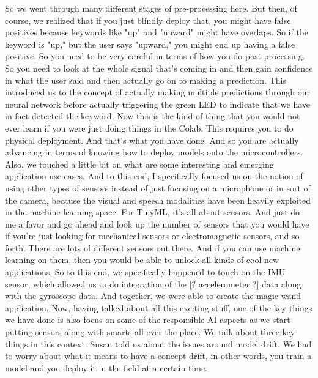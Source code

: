     So we went through many different stages of pre-processing here.
    But then, of course, we realized that if you just blindly deploy that,
    you might have false positives because keywords like "up" and "upward"
    might have overlaps.
    So if the keyword is "up," but the user says "upward,"
    you might end up having a false positive.
    So you need to be very careful in terms of how you do post-processing.
    So you need to look at the whole signal that's coming in
    and then gain confidence in what the user said
    and then actually go on to making a prediction.
    This introduced us to the concept of actually making multiple predictions
    through our neural network before actually
    triggering the green LED to indicate that we
    have in fact detected the keyword.
    Now this is the kind of thing that you would not ever
    learn if you were just doing things in the Colab.
    This requires you to do physical deployment.
    And that's what you have done.
    And so you are actually advancing in terms
    of knowing how to deploy models onto the microcontrollers.
    Also, we touched a little bit on what are some interesting and emerging
    application use cases.
    And to this end, I specifically focused us
    on the notion of using other types of sensors
    instead of just focusing on a microphone or in sort of the camera,
    because the visual and speech modalities have been heavily exploited
    in the machine learning space.
    For TinyML, it's all about sensors.
    And just do me a favor and go ahead and look up the number of sensors
    that you would have if you're just looking
    for mechanical sensors or electromagnetic sensors, and so forth.
    There are lots of different sensors out there.
    And if you can use machine learning on them,
    then you would be able to unlock all kinds of cool new applications.
    So to this end, we specifically happened to touch
    on the IMU sensor, which allowed us to do
    integration of the [? accelerometer ?] data along with the gyroscope data.
    And together, we were able to create the magic wand application.
    Now, having talked about all this exciting stuff,
    one of the key things we have done is also
    focus on some of the responsible AI aspects
    as we start putting sensors along with smarts all over the place.
    We talk about three key things in this context.
    Susan told us about the issues around model drift.
    We had to worry about what it means to have a concept drift, in other words,
    you train a model and you deploy it in the field at a certain time.
